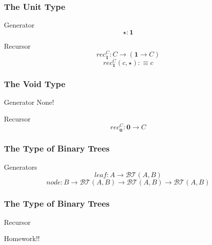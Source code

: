 \documentclass[14pt,compress]{beamer}
\newcommand{\tree}{\mathcal{BT}}
\begin{document}
\begin{frame}\label{frame : unit type}
\frametitle{The Unit Type}

\begin{block}{Generator}
\textcolor{beamer@mathtext}{
\[ \star : \mathbf{1} \]}
\end{block}
\pause
\begin{block}{Recursor}
\textcolor{beamer@mathtext}{
\[ rec_{\mathbf{1}}^C : C \to (\mathbf{1} \to C) \]
\[ rec_{\mathbf{1}}^C(c,\star) :\equiv c \]}
\end{block}
\end{frame}

\begin{frame}\label{frame : void type}
\frametitle{The Void Type}

\begin{block}{Generator}
\textcolor{beamer@mathtext}{
None!}
\end{block}
\pause
\begin{block}{Recursor}
\textcolor{beamer@mathtext}{
\[ rec_{\mathbf{0}}^C : \mathbf{0} \to C \]}
\end{block}
\end{frame}


\begin{frame}\label{frame : gen of tree}
\frametitle{The Type of Binary Trees}

\begin{block}{Generators}
\textcolor{beamer@mathtext}{
\[ leaf : A \to \tree(A,B) \]
\[ node : B \to \tree(A,B) \to \tree(A,B) \to \tree(A,B) \]}
\end{block}
\end{frame}

\begin{frame}\label{frame : rec of tree}
\frametitle{The Type of Binary Trees}

\begin{block}{Recursor}
$ $\\
\pause
\begin{huge}
Homework!!
\end{huge}

\end{block}
\end{frame}
\end{document}
